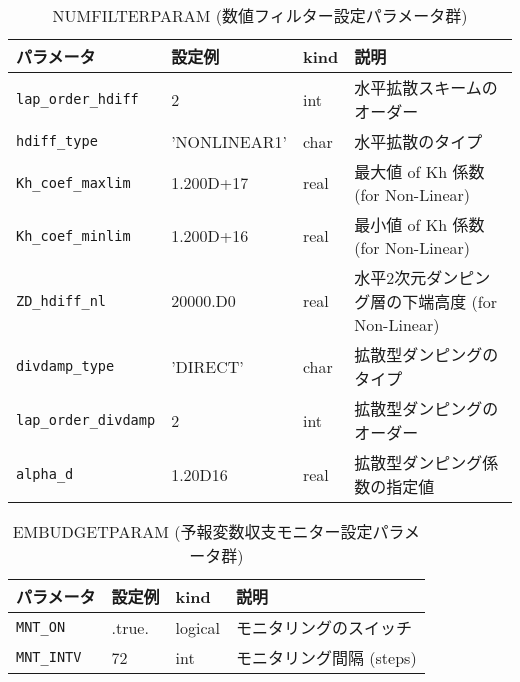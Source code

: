 \begin{table}[htb]
\begin{center}
\caption{NUMFILTERPARAM (数値フィルター設定パラメータ群)}
\begin{tabularx}{150mm}{|l|l|l|X|} \hline
 \rowcolor[gray]{0.9} パラメータ & 設定例 & kind & 説明          \\ \hline
 \verb|lap_order_hdiff| & 2            & int  & 水平拡散スキームのオーダー \\ \hline
 \verb|hdiff_type|      & 'NONLINEAR1' & char & 水平拡散のタイプ \\ \hline
 \verb|Kh_coef_maxlim|  & 1.200D+17    & real & 最大値 of Kh 係数 (for Non-Linear) \\ \hline
 \verb|Kh_coef_minlim|  & 1.200D+16    & real & 最小値 of Kh 係数 (for Non-Linear) \\ \hline
 \verb|ZD_hdiff_nl|     & 20000.D0     & real & 水平2次元ダンピング層の下端高度 (for Non-Linear) \\ \hline
 \verb|divdamp_type|    &  'DIRECT'    & char & 拡散型ダンピングのタイプ \\ \hline
 \verb|lap_order_divdamp| & 2          & int  & 拡散型ダンピングのオーダー \\ \hline
 \verb|alpha_d|         & 1.20D16      & real & 拡散型ダンピング係数の指定値 \\ \hline
\end{tabularx}
\end{center}
\end{table}

\begin{table}[htb]
\begin{center}
\caption{EMBUDGETPARAM (予報変数収支モニター設定パラメータ群)}
\begin{tabularx}{150mm}{|l|l|l|X|} \hline
 \rowcolor[gray]{0.9} パラメータ & 設定例 & kind & 説明          \\ \hline
 \verb|MNT_ON|   & .true. & logical & モニタリングのスイッチ \\ \hline
 \verb|MNT_INTV| & 72     & int     & モニタリング間隔 (steps) \\ \hline
\end{tabularx}
\end{center}
\end{table}

